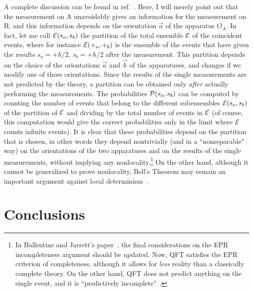 \documentclass[12pt]{article}
\begin{document}
A complete discussion can be found in ref.~\cite{BaJa87}. Here, I will
merely point out that the measurement on A unavoidably gives an
information for the measurement on B, and this information depends on
the orientation $\vec a$ of the apparatus $O_A$. In fact, let me call
${\cal E}(s_a,s_b)$ the partition of the total ensemble ${\cal E}$ of
the coincident events, where for instance ${\cal E}(+_a,+_b)$ is the
ensemble of the events that have given the results $s_a=+\hbar/2$,
$s_b=+\hbar/2$ after the measurement.  This partition depends on the
choice of the orientations $\vec a$ and $\vec b$ of the apparatuses,
and changes if we modify one of these orientations. Since the results
of the single measurements are not predicted by the theory, a
partition can be obtained only \emph{after} actually performing the
measurements. The probabilities ${\cal P}(s_a,s_b)$ can be computed by
counting the number of events that belong to the different
subensembles ${\cal E}(s_a,s_b)$ of the partition of ${\cal E}$ and
dividing by the total number of events in ${\cal E}$ (of course, this
computation would give the correct probabilities only in the limit
where ${\cal E}$ counts infinite events). It is clear that these
probabilities depend on the partition that is chosen, in other words
they depend nontrivially (and in a ``nonseparable" way) on the
orientations of the two apparatuses and on the results of the single
measurements, without implying any nonlocality.\footnote{In Ballentine
and Jarrett's paper~\cite{BaJa87}, the final considerations on the EPR
incompleteness argument should be updated. Now, QFT satisfies the EPR
criterion of completeness, although it allows for \emph{less} reality
than a classically complete theory. On the other hand, QFT does not
predict anything on the single event, and it is ``predictively
incomplete"~\cite{BaJa87}.} On the other hand, although it cannot be
generalized to prove nonlocality, Bell's Theorem may remain an
important argument against local determinism~\cite{BaJa87}.


\section{Conclusions} 
\end{document}
